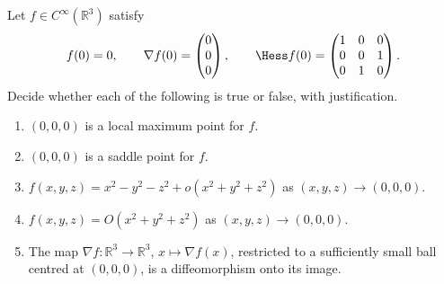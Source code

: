 \begin{exercise}
\label{ex:hessian_gradient_diffeomorphism}
Let $f \in C^\infty(\mathbb{R}^3)$ satisfy
\[f(0) = 0, \qquad \nabla f(0) = \begin{pmatrix} 0 \\ 0 \\ 0 \end{pmatrix}, \qquad
  \Hess f(0) = \begin{pmatrix} 1 & 0 & 0 \\ 0 & 0 & 1 \\ 0 & 1 & 0 \end{pmatrix}.\]
Decide whether each of the following is true or false, with justification.
\begin{enumerate}[label=\textbf{(\alph*)}]
  \item $(0,0,0)$ is a local maximum point for $f$.
  \item $(0,0,0)$ is a saddle point for $f$.
  \item $f(x,y,z) = x^2 - y^2 - z^2 + o(x^2+y^2+z^2)$ as $(x,y,z) \to (0,0,0)$.
  \item $f(x,y,z) = O(x^2+y^2+z^2)$ as $(x,y,z) \to (0,0,0)$.
  \item The map $\nabla f : \mathbb{R}^3 \to \mathbb{R}^3$, $x \mapsto \nabla f(x)$, restricted to a
    sufficiently small ball centred at $(0,0,0)$, is a diffeomorphism onto its image.
\end{enumerate}
\end{exercise}


